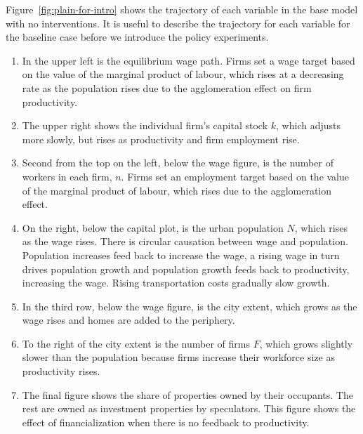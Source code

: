 Figure~\ref{fig:plain-for-intro} shows the trajectory of each variable in the base model with no interventions. %
It is useful to describe the trajectory for each variable for the baseline case before we introduce the policy experiments.  
\begin{enumerate}
\item In the upper left is the equilibrium wage path.  Firms set a wage target based on the value of the marginal product of labour, which rises at a decreasing rate as the population rises due to the agglomeration effect on firm productivity.

\item The upper right shows the individual firm's capital stock $k$, which adjusts more slowly, but rises as productivity and firm employment rise.  %

\item Second from the top on the left, below the wage figure, is the number of workers in each firm, $n$. Firms set an employment target based on the value of the marginal product of labour, which rises due to the agglomeration effect. %

\item On the right, below the capital plot, is the urban population $N$, which rises as the wage rises. There is circular causation between wage and population. Population increases feed back to increase the wage, a rising wage in turn drives population growth and population growth feeds back to productivity, increasing the wage. Rising transportation costs gradually slow growth. %

\item In the third row, below the wage figure, is the city extent, which grows as the wage rises and homes are added to the periphery. 

\item To the right of the city extent is the number of firms $F$, which grows slightly slower than the population because firms increase their workforce size as productivity rises.

\item The final figure shows the share of properties owned by their occupants. The rest are owned as investment properties by speculators. This figure shows the effect of financialization when there is no feedback to productivity. 
\end{enumerate}


